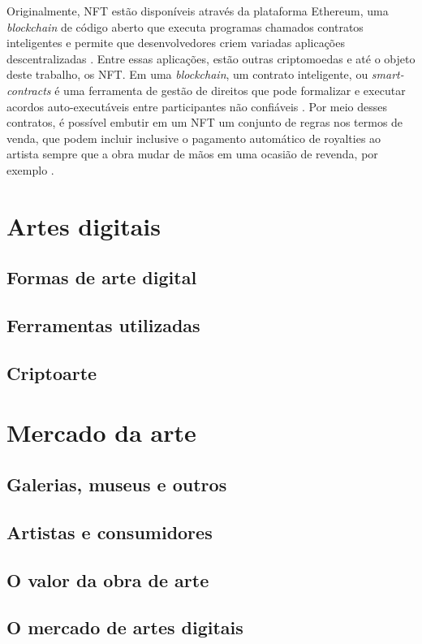 Originalmente, NFT estão disponíveis através da plataforma Ethereum, uma \textit{blockchain} de código aberto que executa programas chamados contratos inteligentes e permite que desenvolvedores criem variadas aplicações descentralizadas \cite{Antonopoulos}. Entre essas aplicações, estão outras criptomoedas e até o objeto deste trabalho, os NFT. Em uma \textit{blockchain}, um contrato inteligente, ou \textit{smart-contracts} é uma ferramenta de gestão de direitos que pode formalizar e executar acordos auto-executáveis entre participantes não confiáveis \cite{Voshmgir}. Por meio desses contratos, é possível embutir em um NFT um conjunto de regras nos termos de venda, que podem incluir inclusive o pagamento automático de royalties ao artista sempre que a obra mudar de mãos em uma ocasião de revenda, por exemplo \cite{Kugler}.



\section{Artes digitais}
\label{sec:non-fungible tokens}

\subsection{Formas de arte digital}
\label{subsec: formas de arte digital}


\subsection{Ferramentas utilizadas}
\label{subsec: ferramentas utilizadas}


\subsection{Criptoarte}
\label{subsec: criptoarte}




\section{Mercado da arte}
\label{sec:non-fungible tokens}

\subsection{Galerias, museus e outros}
\label{subsec: galerias, museus e outros}

\subsection{Artistas e consumidores}
\label{subsec: artistas e consumidores}

\subsection{O valor da obra de arte}
\label{subsec: o valor das obras}

\subsection{O mercado de artes digitais}
\label{subsec: o mercado digital}















